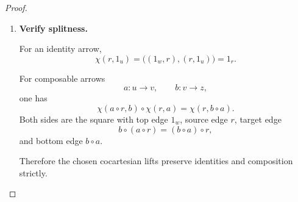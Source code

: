\begin{proof}
\begin{enumerate}
        Define
        \[
            h
            :=
            \bigl(
                (d,s),
                (a\circ r,b)
            \bigr).
        \]
        This is a commutative square because
        \[
            \begin{aligned}
                s\circ d
                &=
                (b\circ a)\circ r
                \\
                &=
                b\circ(a\circ r).
            \end{aligned}
        \]
        It is an arrow
        \[
            h:a\circ r\to s
        \]
        lying over \(b\).

        By the composition formula in
        \(\operatorname{Res}_{\mathbb A}\),
        \[
            h\circ\chi(r,a)
            =
            g.
        \]

        This factorization is unique. Indeed, composition with
        \(\chi(r,a)\) leaves the top edge and the target vertical edge
        unchanged. Thus any square over \(b\) whose composite with
        \(\chi(r,a)\) is \(g\) must have top edge \(d\), target edge \(s\),
        source edge \(a\circ r\), and bottom edge \(b\), and is therefore
        equal to \(h\).

        By Notation~\ref{not:behaviour-generalized-elements}, this
        generalized-element calculation is the equality of the corresponding
        internal morphisms from the pullback object classifying such
        factorization problems. Hence \(\chi(r,a)\) is internally
        cocartesian.

        \item \textbf{Verify splitness.}

        For an identity arrow,
        \[
            \chi(r,1_u)
            =
            \bigl(
                (1_w,r),
                (r,1_u)
            \bigr)
            =
            1_r.
        \]

        For composable arrows
        \[
            a:u\to v,
            \qquad
            b:v\to z,
        \]
        one has
        \[
            \chi(a\circ r,b)\circ\chi(r,a)
            =
            \chi(r,b\circ a).
        \]
        Both sides are the square with top edge \(1_w\), source edge \(r\),
        target edge
        \[
            b\circ(a\circ r)
            =
            (b\circ a)\circ r,
        \]
        and bottom edge \(b\circ a\).

        Therefore the chosen cocartesian lifts preserve identities and
        composition strictly.


\end{enumerate}
\end{proof}
